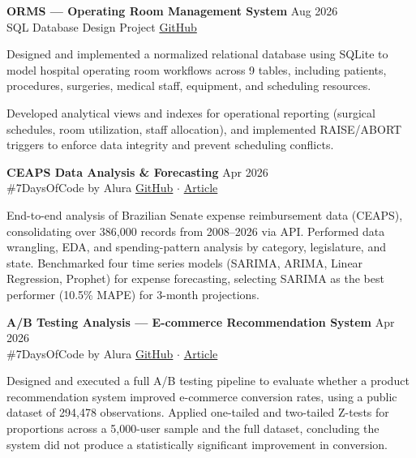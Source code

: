 \justifying
\noindent
\textbf{ORMS — Operating Room Management System} \hfill Aug 2026 \\
SQL Database Design Project \hfill \href{https://github.com/barlettab/harvard-cs50-sql}{GitHub}
\vspace{0.1em}
\begin{zitemize}
\setlength{\itemsep}{0.1em}
    \item Designed and implemented a normalized relational database using SQLite to model hospital operating room workflows across 9 tables, including patients, procedures, surgeries, medical staff, equipment, and scheduling resources.
    \item Developed analytical views and indexes for operational reporting (surgical schedules, room utilization, staff allocation), and implemented RAISE/ABORT triggers to enforce data integrity and prevent scheduling conflicts.
\end{zitemize}
\noindent
\textbf{CEAPS Data Analysis \& Forecasting} \hfill Apr 2026 \\
\#7DaysOfCode by Alura \hfill \href{https://github.com/barlettab/ceaps-data-analysis}{GitHub} $\cdot$ \href{https://medium.com/@barlettabc/o-que-os-dados-revelam-sobre-os-gastos-do-senado-642a91bdd0a4}{Article}
\vspace{0.1em}
\begin{zitemize}
\setlength{\itemsep}{0.1em}
    \item End-to-end analysis of Brazilian Senate expense reimbursement data (CEAPS), consolidating over 386,000 records from 2008–2026 via API. Performed data wrangling, EDA, and spending-pattern analysis by category, legislature, and state. Benchmarked four time series models (SARIMA, ARIMA, Linear Regression, Prophet) for expense forecasting, selecting SARIMA as the best performer (10.5\% MAPE) for 3-month projections.
\end{zitemize}
\vspace{0.2em}
\noindent
\textbf{A/B Testing Analysis — E-commerce Recommendation System} \hfill Apr 2026 \\
\#7DaysOfCode by Alura \hfill \href{https://github.com/barlettab/ab-testing-ecommerce}{GitHub} $\cdot$ \href{https://medium.com/@barlettabc/i-tested-a-product-recommendation-system-the-result-was-no-and-thats-the-point-4449d76658a4}{Article}
\vspace{0.1em}
\begin{zitemize}
\setlength{\itemsep}{0.1em}
    \item Designed and executed a full A/B testing pipeline to evaluate whether a product recommendation system improved e-commerce conversion rates, using a public dataset of 294,478 observations. Applied one-tailed and two-tailed Z-tests for proportions across a 5,000-user sample and the full dataset, concluding the system did not produce a statistically significant improvement in conversion.
\end{zitemize}
